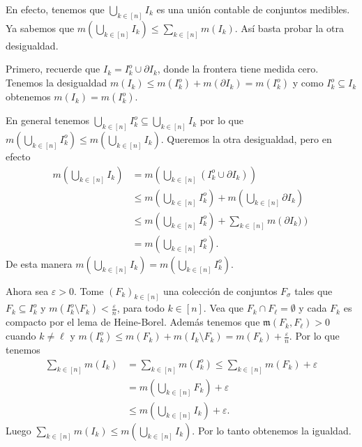 \documentclass[12pt]{article}
\theoremstyle{plain}
\theoremstyle{definition}
\theoremstyle{remark}
\numberwithin{equation}{section}
\newcommand{\mm}{\mathfrak{m}}      %
\renewcommand{\leq}{\leqslant}      %
\renewcommand{\:}{\colon}           %
\newcommand{\bonj}[1]{\left\lbrack#1\right\rbrack}
\begin{document}
\begin{multicols}{2}
\begin{ptcbp}
En efecto, tenemos que $\bigcup_{k\in\bonj{n}}I_k$ es una unión contable de conjuntos medibles. Ya sabemos que $m\left(\bigcup_{k\in\bonj{n}}I_k\right)\leq\sum_{k\in\bonj{n}}m(I_k)$. Así basta probar la otra desigualdad.\par
Primero, recuerde que $I_k=I_k^o\cup\partial I_k$, donde la frontera tiene medida cero. Tenemos la desigualdad $m(I_k)\leq m(I_k^o)+m(\partial I_k)=m(I_k^o)$ y como $I_k^o\subseteq I_k$ obtenemos $m(I_k)=m(I_k^o)$.\par
 En general tenemos $\bigcup_{k\in\bonj{n}}I_k^o\subseteq\bigcup_{k\in\bonj{n}}I_k$ por lo que $m\left(\bigcup_{k\in\bonj{n}}I_k^o\right)\leq m\left(\bigcup_{k\in\bonj{n}}I_k\right)$. Queremos la otra desigualdad, pero en efecto
 \begin{align*}
   m\left(\bigcup_{k\in\bonj{n}}I_k\right) &=m\left(\bigcup_{k\in\bonj{n}}(I_k^o\cup\partial I_k)\right)\\
   &\leq m\left(\bigcup_{k\in\bonj{n}}I_k^o\right)+m\left(\bigcup_{k\in\bonj{n}}\partial I_k\right)\\
   &\leq  m\left(\bigcup_{k\in\bonj{n}}I_k^o\right)+\sum_{k\in\bonj{n}}m\left(\partial I_k)\right)\\
   &=m\left(\bigcup_{k\in\bonj{n}}I_k^o\right).
 \end{align*}
 De esta manera $m\left(\bigcup_{k\in\bonj{n}}I_k\right)=m\left(\bigcup_{k\in\bonj{n}}I_k^o\right)$.\par
 Ahora sea $\varepsilon>0$. Tome $(F_k)_{k\in\bonj{n}}$ una colección de conjuntos $F_\sigma$ tales que $F_k\subseteq I_k^o$ y $m(I_k^o\setminus F_k)<\frac{\varepsilon}{n}$, para todo $k\in\bonj{n}$. Vea que $F_k\cap F_\ell =\emptyset$ y cada $F_k$ es compacto por el lema de Heine-Borel. Además tenemos que $\mm(F_k,F_\ell)>0$ cuando $k\neq \ell$ y $m(I_k^o)\leq m(F_k)+m(I_k\setminus F_k)=m(F_k)+\frac{\varepsilon}{n}$. Por lo que tenemos
 \begin{align*}
   \sum_{k\in\bonj{n}}m(I_k) &=\sum_{k\in\bonj{n}}m(I_k^o)\leq \sum_{k\in\bonj{n}}m(F_k)+\varepsilon\\
   &=m\left(\bigcup_{k\in\bonj{n}}F_k\right)+\varepsilon\\
   &\leq m\left(\bigcup_{k\in\bonj{n}}I_k\right)+\varepsilon.
 \end{align*}
 Luego $\sum_{k\in\bonj{n}}m(I_k)\leq m\left(\bigcup_{k\in\bonj{n}}I_k\right)$. Por lo tanto obtenemos la igualdad.
\end{ptcbp}



\end{multicols}
\end{document}
